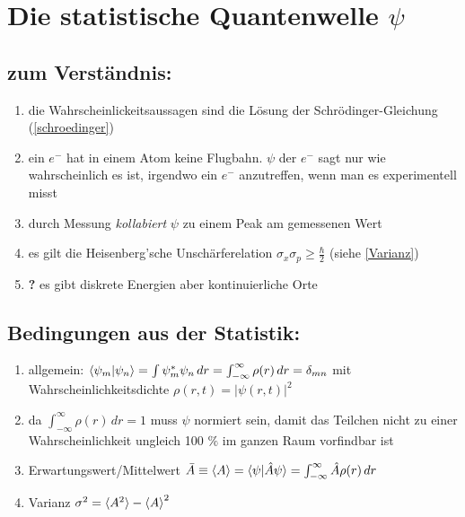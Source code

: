 \section{Die statistische Quantenwelle $\psi$}

\subsection{zum Verständnis:}
\begin{enumerate}
    \item die Wahrscheinlickeitsaussagen sind die Lösung der Schrödinger-Gleichung (\ref{schroedinger})
    \item ein $e^-$ hat in einem Atom keine Flugbahn. $\psi$ der $e^-$ sagt nur wie wahrscheinlich es ist,
    irgendwo ein $e^-$  anzutreffen, wenn man es experimentell misst
    \item durch Messung \textit{kollabiert} $\psi$ zu einem Peak am gemessenen Wert 
    \item es gilt die Heisenberg'sche Unschärferelation $\sigma_x\sigma_p\geq\frac{\hbar}{2}$ (siehe \ref{Varianz})
    \item \textbf{?} es gibt diskrete Energien aber kontinuierliche Orte 
\end{enumerate}

\subsection{Bedingungen aus der Statistik:}
\begin{enumerate}
    \item allgemein: $\braket{\psi_m|\psi_n}=\int \psi_m^*\psi_n \,dr=\int_{-\infty}^{\infty}\rho(r)\,dr=\delta_{mn}$ 
    mit Wahrscheinlichkeitsdichte $\rho(r,t)=|\psi(r,t)|^2$
    \item da $\int_{-\infty}^{\infty} \rho(r) \,dr=1$ muss $\psi$ normiert sein, damit 
    das Teilchen nicht zu einer Wahrscheinlichkeit ungleich 100 $\%$ im ganzen Raum vorfindbar ist \label{normiert}
    \item Erwartungswert/Mittelwert $\bar{A}\equiv\braket{A}=\braket{\psi|\hat{A}\psi}=\int_{-\infty}^{\infty}\hat{A}\rho(r)\,dr$
    \item Varianz $\sigma^2=\braket{A^2}-\braket{A}^2$ \label{Varianz}
\end{enumerate}


